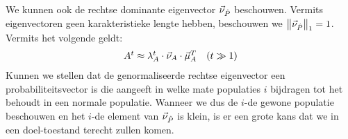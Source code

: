 We kunnen ook de rechtse dominante eigenvector $\evr[\hat{P}]$ beschouwen. Vermits eigenvectoren geen karakteristieke lengte hebben, beschouwen we $\dabs{\evr[\hat{P}]}_1=1$. Vermits het volgende geldt:
\begin{equation}
\conditional{A^t\approx\ev[A]^t\cdot\evr[A]\cdot\evl[A]^T}{$t\gg1$}
\end{equation}
Kunnen we stellen dat de genormaliseerde rechtse eigenvector een probabiliteitsvector is die aangeeft in welke mate populaties $i$ bijdragen tot het behoudt in een normale populatie. Wanneer we dus de $i$-de gewone populatie beschouwen en het $i$-de element van $\evr[\hat{P}]$ is klein, is er een grote kans dat we in een doel-toestand terecht zullen komen.

\paragraph{}

